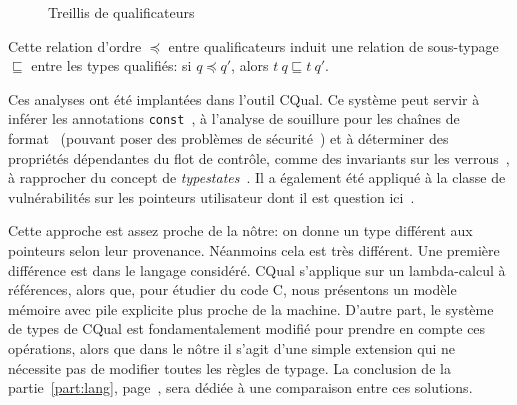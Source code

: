 \begin{figure}[h]
\centering
{}

\caption{Treillis de qualificateurs}
\label{fig:cqual-treillis}
\end{figure}

Cette relation d'ordre $\preceq$ entre qualificateurs induit une relation de
sous-typage $\sqsubseteq$ entre les types qualifiés: si $q \preceq q'$, alors
$t~q \sqsubseteq t~q'$.

Ces analyses ont été implantées dans l'outil CQual. Ce système peut servir à
inférer les annotations \texttt{const}~\cite{pldi99}, à l'analyse de souillure
pour les chaînes de format~\cite{usenix01} (pouvant poser des problèmes de
sécurité~\cite{format-string-attacks}) et à déterminer des propriétés
dépendantes du flot de contrôle, comme des invariants sur les
verrous~\cite{pldi02}, à rapprocher du concept de
\emph{typestates}~\cite{tse12-typestate}. Il a également été appliqué à la
classe de vulnérabilités sur les pointeurs utilisateur dont il est question
ici~\cite{cquk-usenix04}.

Cette approche est assez proche de la nôtre: on donne un type différent aux
pointeurs selon leur provenance. Néanmoins cela est très différent. Une première
différence est dans le langage considéré. CQual s'applique sur un lambda-calcul
à références, alors que, pour étudier du code C, nous présentons un modèle
mémoire avec pile explicite plus proche de la machine. D'autre part, le système
de types de CQual est fondamentalement modifié pour prendre en compte ces
opérations, alors que dans le nôtre il s'agit d'une simple extension qui ne
nécessite pas de modifier toutes les règles de typage. La conclusion de la
partie~\ref{part:lang}, page~\pageref{cha:ccl2}, sera dédiée à une comparaison
entre ces solutions.

